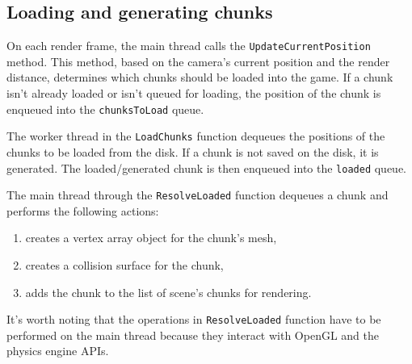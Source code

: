 \subsection{Loading and generating chunks} \label{subsec:loading-and-generating}
On each render frame, the main thread calls the \texttt{UpdateCurrentPosition} method.
This method, based on the camera's current position and the render distance, determines which chunks should be loaded into the game.
If a chunk isn't already loaded or isn't queued for loading, the position of the chunk is enqueued into the \texttt{chunksToLoad} queue.

The worker thread in the \texttt{LoadChunks} function dequeues the positions of the chunks to be loaded from the disk.
If a chunk is not saved on the disk, it is generated.
The loaded/generated chunk is then enqueued into the \texttt{loaded} queue.

The main thread through the \texttt{ResolveLoaded} function dequeues a chunk and performs the following actions:
\begin{enumerate}
    \item creates a vertex array object for the chunk's mesh,
    \item creates a collision surface for the chunk,
    \item adds the chunk to the list of scene's chunks for rendering.
\end{enumerate}

It's worth noting that the operations in \texttt{ResolveLoaded} function have to be performed on the main thread because they interact with OpenGL and the physics engine APIs.